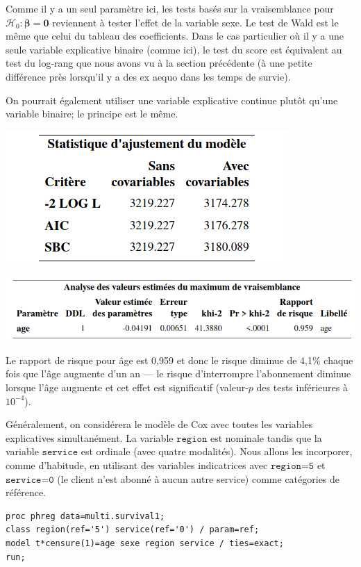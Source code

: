 \documentclass[
  11pt,
  letterpaper,
]{book}
\theoremstyle{definition}
\theoremstyle{definition}
\theoremstyle{definition}
\theoremstyle{remark}
\begin{document}
Comme il y a un seul paramètre ici, les tests basés sur la vraisemblance pour \(\mathcal{H}_0: \boldsymbol{\beta}=\boldsymbol{0}\) reviennent à tester l'effet de la variable sexe. Le test de Wald est le même que celui du tableau des coefficients. Dans le cas particulier où il y a une seule variable explicative binaire (comme ici), le test du score est équivalent au test du log-rang que nous avons vu à la section précédente (à une petite différence près lorsqu'il y a des ex aequo dans les temps de survie).

On pourrait également utiliser une variable explicative continue plutôt qu'une variable binaire; le principe est le même.

\begin{center}\includegraphics[width=0.45\linewidth]{figures/05-survie-e13} \end{center}

\begin{center}\includegraphics[width=0.85\linewidth]{figures/05-survie-e14} \end{center}

Le rapport de risque pour âge est 0,959 et donc le risque diminue de 4,1\% chaque fois que l'âge augmente d'un an --- le risque d'interrompre l'abonnement diminue lorsque l'âge augmente et cet effet est significatif (valeur-\(p\) des tests inférieures à \(10^{-4}\)).

Généralement, on considérera le modèle de Cox avec toutes les variables explicatives simultanément. La variable \(\texttt{region}\) est nominale tandis que la variable \(\texttt{service}\) est ordinale (avec quatre modalités). Nous allons les incorporer, comme d'habitude, en utilisant des variables indicatrices avec \(\texttt{region=5}\) et \(\texttt{service=0}\) (le client n'est abonné à aucun autre service) comme catégories de référence.

\begin{verbatim}
proc phreg data=multi.survival1;
class region(ref='5') service(ref='0') / param=ref;
model t*censure(1)=age sexe region service / ties=exact; 
run;
\end{verbatim}
\end{document}
